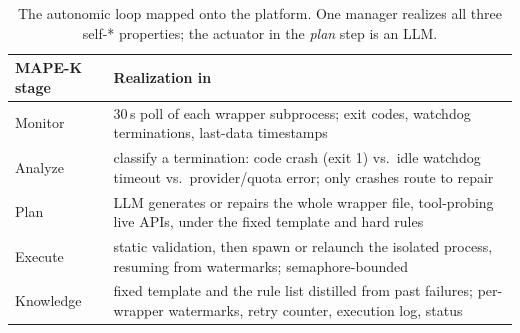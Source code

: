 \begin{table}[t]
\centering
\caption{The autonomic loop mapped onto the platform. One manager realizes all
three self-* properties; the actuator in the \emph{plan} step is an LLM.}
\label{tab:mapek}
\begin{tabular}{@{}lp{}@{}}
\toprule
MAPE-K stage & Realization in \sys{} \\
\midrule
Monitor   & 30\,s poll of each wrapper subprocess; exit codes, watchdog
            terminations, last-data timestamps \\
Analyze   & classify a termination: code crash (exit 1) vs.\ idle watchdog
            timeout vs.\ provider/quota error; only crashes route to repair \\
Plan      & LLM generates or repairs the whole wrapper file, tool-probing live
            APIs, under the fixed template and hard rules \\
Execute   & static validation, then spawn or relaunch the isolated process,
            resuming from watermarks; semaphore-bounded \\
Knowledge & fixed template and the rule list distilled from past failures;
            per-wrapper watermarks, retry counter, execution log, status \\
\bottomrule
\end{tabular}
\end{table}
